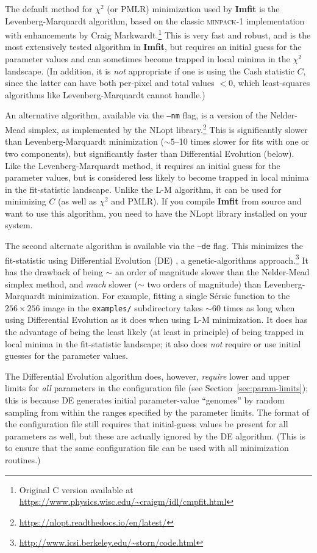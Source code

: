 \documentclass[10pt,a4paper,article]{memoir}
\newcommand{\imfit}{\textbf{Imfit}}
\newcommand{\chisquare}{\ensuremath{\chi^{2}}}
\newcommand{\pmlr}{PMLR}
\begin{document}
The default method for \chisquare{} (or \pmlr) minimization
used by \imfit{} is the Levenberg-Marquardt algorithm, based on the
classic \textsc{minpack-1} implementation \citep{more78} with
enhancements by Craig Markwardt.\footnote{Original C version available
at \url{https://www.physics.wisc.edu/~craigm/idl/cmpfit.html}} This is
very fast and robust, and is the most extensively tested algorithm in
\imfit, but requires an initial guess for the parameter values and can
sometimes become trapped in local minima in the \chisquare{} landscape.
(In addition, it is \textit{not} appropriate if one is using the Cash
statistic $C$, since the latter can have both per-pixel and total values
$< 0$, which least-squares algorithms like Levenberg-Marquardt cannot
handle.)

An alternative algorithm, available via the \texttt{--nm} flag,  is a
version of the Nelder-Mead simplex, as implemented by the NLopt
library.\footnote{\url{https://nlopt.readthedocs.io/en/latest/}}
This is significantly slower than Levenberg-Marquardt minimization
($\sim 5$--10 times slower for fits with one or two components), but
significantly faster than Differential Evolution (below). Like the
Levenberg-Marquardt method, it requires an initial guess for the
parameter values, but is considered less likely to become trapped in
local minima in the fit-statistic landscape. Unlike the L-M algorithm,
it can be used for minimizing $C$ (as well as \chisquare{} and
\pmlr). If you compile \imfit{} from source and want to use
this algorithm, you need to have the NLopt library installed on your
system.

The second alternate algorithm is available via the \texttt{--de} flag.
This minimizes the fit-statistic using Differential Evolution (DE)
\citep{de}, a genetic-algorithms
approach.\footnote{\url{http://www.icsi.berkeley.edu/~storn/code.html}}
It has the drawback of being $\sim$ an order of magnitude slower than
the Nelder-Mead simplex method, and \textit{much} slower ($\sim$ two
orders of magnitude) than Levenberg-Marquardt minimization. For example,
fitting a single S\'ersic function to the $256 \times 256$ image in the
\texttt{examples/} subdirectory takes $\sim 60$ times as long when using
Differential Evolution as it does when using L-M minimization. It does
has the advantage of being the least likely (at least in principle) of
being trapped in local minima in the fit-statistic landscape; it also
does \textit{not} require or use initial guesses for the parameter values.

The Differential Evolution algorithm does, however, \textit{require}
lower and upper limits for \textit{all} parameters in the configuration
file (see Section~\ref{sec:param-limits}); this is because DE generates
initial parameter-value ``genomes'' by random sampling from within the
ranges specified by the parameter limits. The format of the
configuration file still requires that initial-guess values be present
for all parameters as well, but these are actually ignored by the DE
algorithm. (This is to ensure that the same configuration file can be
used with all minimization routines.)
\end{document}
